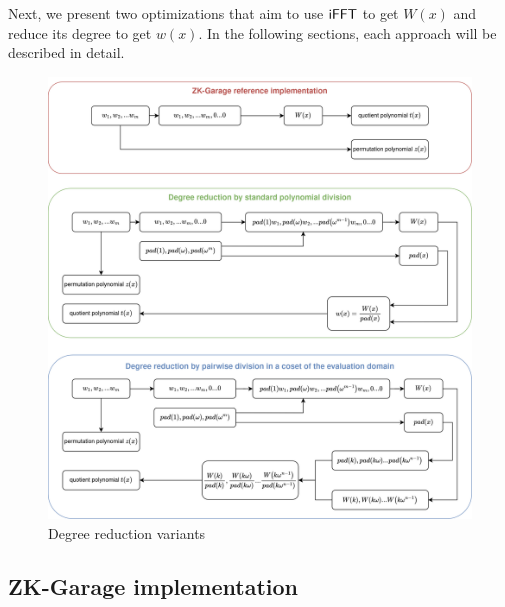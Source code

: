 Next, we present two optimizations that aim to use $\mathsf{iFFT}$ to get $W(x)$ and reduce its degree to get $w(x)$. In the following sections, each approach will be described in detail.

\begin{figure}[H]
    \centering
    \includegraphics[width=1\linewidth]{figures/optimizations/degree_reduction_diagram.drawio.png}
    \caption{Degree reduction variants}
    \label{fig:degree-reduction}
\end{figure}

\subsection{ZK-Garage implementation}

\begin{pchstack}
\end{pchstack}

